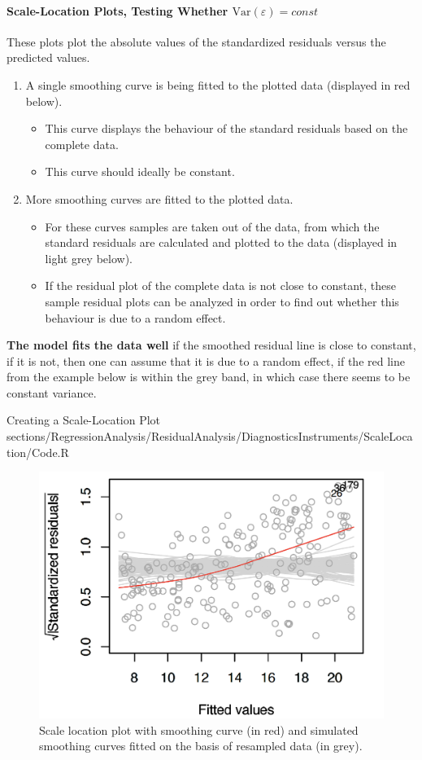 \paragraph{Scale-Location Plots, Testing Whether $\mathrm{Var}(\varepsilon) = const$}
	These plots plot the absolute values of the standardized residuals versus the predicted values. 
	
	\begin{enumerate}
	  	\item A single smoothing curve is being fitted to the plotted data (displayed in red below).  
	  		\begin{itemize}
	  		  \item This curve displays the behaviour of the standard residuals based on the complete data.
	  		  \item This curve should ideally be constant.
	  		\end{itemize}
	  	\item More smoothing curves are fitted to the plotted data. 
	  		\begin{itemize}
	  		  \item For these curves samples are taken out of the data, from which the standard residuals are calculated and plotted to the data (displayed in light grey below).
	  		  \item If the residual plot of the complete data is not close to constant, these sample residual plots can be analyzed in order to find out whether this behaviour is due to a random effect.
	  		\end{itemize}
	  	\end{enumerate}	
	
	\textbf{The model fits the data well} if the smoothed residual line is close to constant, if it is not, then one can assume that it is due to a random effect, if the red line from the example below is within the grey band, in which case there seems to be constant variance.
	
	\RCode
	{
		Creating a Scale-Location Plot
	}
	{
		sections/RegressionAnalysis/ResidualAnalysis/DiagnosticsInstruments/ScaleLocation/Code.R
	}
	
	\begin{figure}[H]\centering
		\includegraphics[width=0.6\linewidth]{images/ScaleLocation.png}
		\caption{Scale location plot with smoothing curve (in red) and simulated smoothing curves fitted on the basis of resampled data (in grey).}
	\end{figure}